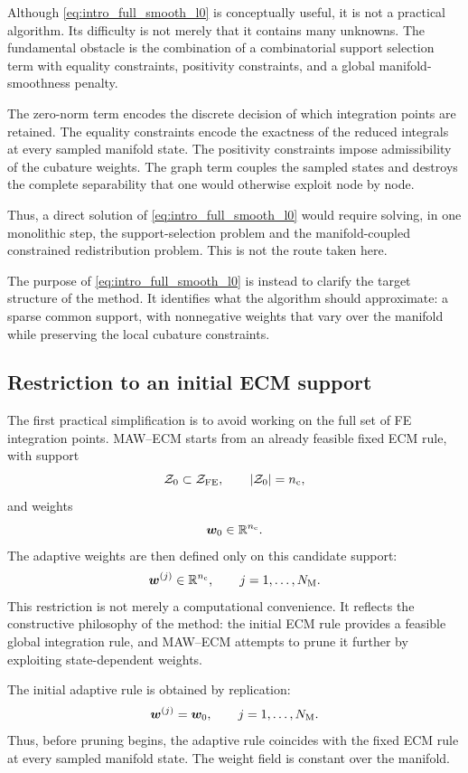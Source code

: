 \documentclass[11pt,a4paper]{article}
\begin{document}
Although \eqref{eq:intro_full_smooth_l0} is conceptually useful, it is not a
practical algorithm. Its difficulty is not merely that it contains many
unknowns. The fundamental obstacle is the combination of a combinatorial support
selection term with equality constraints, positivity constraints, and a global
manifold-smoothness penalty.

The zero-norm term encodes the discrete decision of which integration points
are retained. The equality constraints encode the exactness of the reduced
integrals at every sampled manifold state. The positivity constraints impose
admissibility of the cubature weights. The graph term couples the sampled
states and destroys the complete separability that one would otherwise exploit
node by node.

Thus, a direct solution of \eqref{eq:intro_full_smooth_l0} would require
solving, in one monolithic step, the support-selection problem and the
manifold-coupled constrained redistribution problem. This is not the route
taken here.

The purpose of \eqref{eq:intro_full_smooth_l0} is instead to clarify the target
structure of the method. It identifies what the algorithm should approximate:
a sparse common support, with nonnegative weights that vary over the manifold
while preserving the local cubature constraints.

\subsection{Restriction to an initial ECM support}

The first practical simplification is to avoid working on the full set of FE
integration points. MAW--ECM starts from an already feasible fixed ECM rule,
with support
\[
        \mathcal{Z}_{0}\subset\mathcal{Z}_{\mathrm{FE}},
        \qquad
        |\mathcal{Z}_{0}|=n_{\mathrm{c}},
\]
and weights
\[
        \bm w_{0}\in\mathbb{R}^{n_{\mathrm{c}}}.
\]
The adaptive weights are then defined only on this candidate support:
\[
        \bm w^{(j)}\in\mathbb{R}^{n_{\mathrm{c}}},
        \qquad
        j=1,\ldots,N_{\mathrm{M}}.
\]
This restriction is not merely a computational convenience. It reflects the
constructive philosophy of the method: the initial ECM rule provides a feasible
global integration rule, and MAW--ECM attempts to prune it further by exploiting
state-dependent weights.

The initial adaptive rule is obtained by replication:
\[
        \bm w^{(j)}=\bm w_{0},
        \qquad
        j=1,\ldots,N_{\mathrm{M}}.
        \label{eq:intro_initial_replication}
\]
Thus, before pruning begins, the adaptive rule coincides with the fixed ECM
rule at every sampled manifold state. The weight field is constant over the
manifold.
\end{document}
